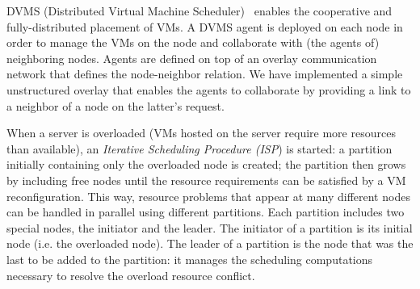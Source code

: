 DVMS (Distributed Virtual Machine Scheduler)~\cite{quesnel:cpe2012} enables the
cooperative and fully-distributed placement of
VMs.
%
%
%
%
%
A DVMS agent is deployed on each node in order to manage the VMs on
the node and collaborate with (the agents of) neighboring nodes.
Agents are defined on top of an overlay communication network that
defines the node-neighbor relation.
We have implemented a simple %
unstructured overlay that enables the agents to collaborate
by providing a link to a neighbor of a node on the latter's request.

When a server is overloaded (\ie VMs hosted on the server require more
resources than available), an \emph{Iterative Scheduling Procedure
  (ISP}) is started: a partition initially containing only the
overloaded node is created; the partition then grows by including free
nodes until the resource requirements can be satisfied by a VM
reconfiguration. This way, resource problems that appear at many
different nodes can be handled in parallel using different
partitions.
%
Each partition includes two special nodes, the initiator and the
leader.  The initiator of a partition is its initial node (i.e. the
overloaded node).  The leader of a partition is the node that was the
last to be added to the partition: it manages the scheduling
computations necessary to resolve the overload resource conflict. 

